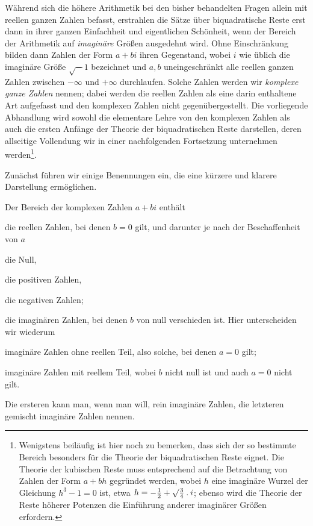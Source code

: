Während sich die höhere Arithmetik bei den bisher behandelten Fragen allein mit reellen ganzen Zahlen befasst, erstrahlen die Sätze über biquadratische Reste erst dann in ihrer ganzen Einfachheit und eigentlichen Schönheit, wenn der Bereich der Arithmetik auf \emph{imaginäre} Größen ausgedehnt wird. Ohne Einschränkung bilden dann Zahlen der Form $a+bi$ ihren Gegenstand, wobei $i$ wie üblich die imaginäre Größe $\surd-1$ bezeichnet und $a,b$ uneingeschränkt alle reellen ganzen Zahlen zwischen $-\infty$ und $+\infty$ durchlaufen. Solche Zahlen werden wir \emph{komplexe ganze Zahlen} nennen; dabei werden die reellen Zahlen als eine darin enthaltene Art aufgefasst und den komplexen Zahlen nicht gegenübergestellt. Die vorliegende Abhandlung wird sowohl die elementare Lehre von den komplexen Zahlen als auch die ersten Anfänge der Theorie der biquadratischen Reste darstellen, deren allseitige Vollendung wir in einer nachfolgenden Fortsetzung unternehmen werden\begingroup\renewcommand{\thefootnote}{*)}\footnote{Wenigstens beiläufig ist hier noch zu bemerken, dass sich der so bestimmte Bereich besonders für die Theorie der biquadratischen Reste eignet. Die Theorie der kubischen Reste muss entsprechend auf die Betrachtung von Zahlen der Form $a+bh$ gegründet werden, wobei $h$ eine imaginäre Wurzel der Gleichung $h^3-1=0$ ist, etwa $h=-\frac12+\surd\frac34\mathbin{.} i$; ebenso wird die Theorie der Reste höherer Potenzen die Einführung anderer imaginärer Größen erfordern.}\endgroup.

\clearpage
{}
Zunächst führen wir einige Benennungen ein, die eine kürzere und klarere Darstellung ermöglichen.

Der Bereich der komplexen Zahlen $a+bi$ enthält
\begin{list}{}{\setlength{\leftmargin}{1.6em}\setlength{\labelwidth}{1.4em}\setlength{\labelsep}{.2em}}
\item[I.] die reellen Zahlen, bei denen $b=0$ gilt, und darunter je nach der Beschaffenheit von $a$
\begin{list}{}{\setlength{\leftmargin}{1.7em}\setlength{\labelwidth}{1.5em}\setlength{\labelsep}{.2em}}
\item[1)] die Null,
\item[2)] die positiven Zahlen,
\item[3)] die negativen Zahlen;
\end{list}
\item[II.] die imaginären Zahlen, bei denen $b$ von null verschieden ist. Hier unterscheiden wir wiederum
\begin{list}{}{\setlength{\leftmargin}{1.7em}\setlength{\labelwidth}{1.5em}\setlength{\labelsep}{.2em}}
\item[1)] imaginäre Zahlen ohne reellen Teil, also solche, bei denen $a=0$ gilt;
\item[2)] imaginäre Zahlen mit reellem Teil, wobei $b$ nicht null ist und auch $a=0$ nicht gilt.
\end{list}
\end{list}
Die ersteren kann man, wenn man will, rein imaginäre Zahlen, die letzteren gemischt imaginäre Zahlen nennen.


